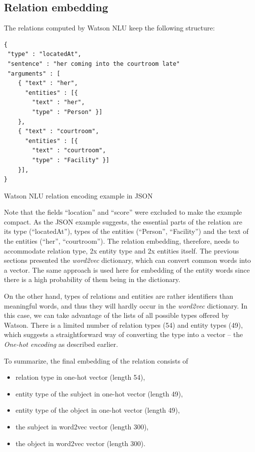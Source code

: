 \documentclass[
  digital, %
  notable,   %
  nolof,     %
  nolot,     %
]{fithesis3}
\begin{document}
\subsection{Relation embedding}
\label{sec:relation_embedding}
The relations computed by Watson NLU keep the following structure:
\begin{listing}[H]
\begin{verbatim}
{    
 "type" : "locatedAt",
 "sentence" : "her coming into the courtroom late"
 "arguments" : [
    { "text" : "her", 
      "entities" : [{ 
      	"text" : "her", 
      	"type" : "Person" }] 
    }, 
    { "text" : "courtroom",  
      "entities" : [{ 
      	"text" : "courtroom", 
      	"type" : "Facility" }] 
    }], 
}
\end{verbatim}
\caption{Watson NLU relation encoding example in JSON} 
\label{json:relation}
\end{listing}
Note that the fields ``location'' and ``score'' were excluded to make the example compact.
As the JSON example suggests, the essential parts of the relation are its type (``locatedAt''), types of the entities (``Person'', ``Facility'') and the text of the entities (``her'', ``courtroom'').
The relation embedding, therefore, needs to accommodate relation type, 2x entity type and 2x entities itself.
The previous sections presented the \textit{word2vec} dictionary, which can convert common words into a vector.
The same approach is used here for embedding of the entity words since there is a high probability of them being in the dictionary.

On the other hand, types of relations and entities are rather identifiers than meaningful words, and thus they will hardly occur in the \textit{word2vec} dictionary.
In this case, we can take advantage of the lists of all possible types offered by Watson.
There is a limited number of relation types (54) and entity types (49), which suggests a straightforward way of converting the type into a vector -- the \textit{One-hot encoding} as described earlier.

To summarize, the final embedding of the relation consists of
\begin{itemize}
\item relation type in one-hot vector (length 54),
\item entity type of the subject in one-hot vector (length 49),
\item entity type of the object in one-hot vector (length 49),
\item the subject in word2vec vector (length 300),
\item the object in word2vec vector (length 300).
\end{itemize}
\end{document}
